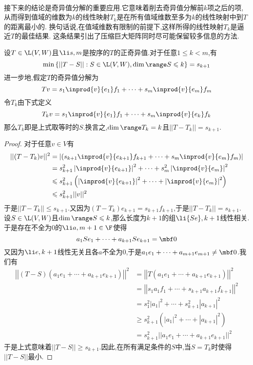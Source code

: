 \documentclass{ctexart}
\begin{document}
\\
接下来的结论是奇异值分解的重要应用.它意味着削去奇异值分解前$k$项之后的项,%
从而得到值域的维数为$k$的线性映射$T_k$是在所有值域维数至多为$k$的线性映射中到$T$的距离最小的.%
换句话说,在值域维数有限制的前提下,这样所得的线性映射$T_k$是逼近$T$的最佳结果.%
这条结果引出了压缩巨大矩阵同时尽可能保留较多信息的方法.
\begin{formal}[2.1 限制值域维数得到的线性映射的最佳逼近]
    设$T\in\L(V,W)$且$\li s,m$是按序的$T$的正奇异值.对于任意$1\leqslant k<m$,有
    \[\min\left\{||T-S||:S\in\L(V,W),\dim\range S\leqslant k\right\}=s_{k+1}\]
    进一步地,假定$T$的奇异值分解为
    \[Tv=s_1\inprod{v}{e_1}f_1+\cdots+s_m\inprod{v}{e_m}f_m\]
    令$T_k$由下式定义
    \[T_kv=s_1\inprod{v}{e_1}f_1+\cdots+s_m\inprod{v}{e_k}f_k\]
    那么$T_k$即是上式取等时的$S$.换言之,$\dim\range T_k=k$且$||T-T_k||=s_{k+1}$.
\end{formal}
\begin{proof}
    对于任意$v\in V$有
    \[\begin{aligned}
        ||(T-T_k)v||^2
        &= \left|\left(s_{k+1}\inprod{v}{e_{k+1}}f_{k+1}+\cdots+s_m\inprod{v}{e_m}f_m\right)\right| \\
        &= s_{k+1}^2\left|\inprod{v}{e_{k+1}}\right|^2+\cdots+s_{m}^2\left|\inprod{v}{e_{m}}\right|^2 \\
        &\leqslant s_{k+1}^2\left(\left|\inprod{v}{e_{k+1}}\right|^2+\cdots+\left|\inprod{v}{e_{m}}\right|^2\right) \\
        &\leqslant s_{k+1}^2||v||^2
    \end{aligned}\]
    于是$||T-T_k||\leqslant s_{k+1}$.又因为$(T-T_k)e_{k+1}=s_{k+1}f_{k+1}$,于是$||T-T_k||=s_{k+1}$.\\
    设$S\in\L(V,W)$且$\dim\range S\leqslant k$,那么长度为$k+1$的组$\li {Se},{k+1}$线性相关.\\
    于是存在不全为$0$的$\li a,{m+1}\in\F$使得
    \[a_1Se_1+\cdots+a_{k+1}Se_{k+1}=\mbf0\]
    又因为$\li e,{k+1}$线性无关且各$a$不全为$0$,于是$a_1e_1+\cdots+a_{m+1}e_{m+1}\neq\mbf0$.我们有
    \[\begin{aligned}
        \left|\left|\left(T-S\right)\left(a_1e_1+\cdots+a_{k+1}e_{k+1}\right)\right|\right|^2
        &= \left|\left|T\left(a_1e_1+\cdots+a_{k+1}e_{k+1}\right)\right|\right|^2 \\
        &= \left|\left|s_1a_1f_1+\cdots+s_{k+1}a_{k+1}f_{k+1}\right|\right|^2 \\
        &= s_1^2|a_1|^2+\cdots+s_{k+1}^2|a_{k+1}|^2 \\
        &\geqslant s_{k+1}^2\left(|a_1|^2+\cdots+|a_{k+1}|^2\right) \\
        &= s_{k+1}^2||a_1e_1+\cdots+a_{k+1}e_{k+1}||^2
    \end{aligned}\]
    于是上式意味着$||T-S||\geqslant s_{k+1}$.因此,在所有满足条件的$S$中,当$S=T_k$时使得$||T-S||$最小.
\end{proof}\noindent
\end{document}
